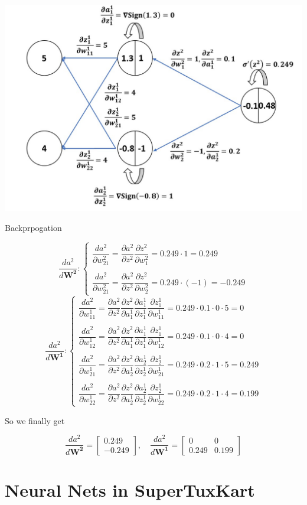 \documentclass{article}
\begin{document}
		$$$$
        \begin{minipage}[t]{\linewidth}
        		\captionsetup{type=figure}
               	\centering
               	\includegraphics[width=0.6\linewidth]
                				{images/Q2b.jpg}
                \caption{Backprpogation}      
        \end{minipage} 
        
		\newpage        
		\[
  			\dfrac{da^2}{d\boldsymbol{W^2}}:
  			\begin{cases}
               \dfrac{da^2}{\partial{w^2_{21}}}=\dfrac{\partial a^2}{\partial{z^2}}\dfrac{\partial z^2}{\partial{w^2_1}}=0.249\cdot1=0.249\\\\
               \dfrac{da^2}{\partial{w^2_{21}}}=\dfrac{\partial a^2}{\partial{z^2}}\dfrac{\partial z^2}{\partial{w^2_2}}=0.249\cdot(-1)=-0.249
            \end{cases}
		\]
		$$$$
		\[
  			\dfrac{da^2}{d\boldsymbol{W^1}}:
  			\begin{cases}
               \dfrac{da^2}{\partial{w^1_{11}}}=\dfrac{\partial a^2}{\partial{z^2}}\dfrac{\partial z^2}{\partial{a^1_1}}\dfrac{\partial a^1_1}{\partial{z^1_1}}\dfrac{\partial z^1_1}{\partial{w^1_{11}}}=0.249\cdot0.1\cdot0\cdot5=0\\\\
               \dfrac{da^2}{\partial{w^1_{12}}}=\dfrac{\partial a^2}{\partial{z^2}}\dfrac{\partial z^2}{\partial{a^1_1}}\dfrac{\partial a^1_1}{\partial{z^1_1}}\dfrac{\partial z^1_1}{\partial{w^1_{12}}}=0.249\cdot0.1\cdot0\cdot4=0\\\\
               \dfrac{da^2}{\partial{w^1_{21}}}=\dfrac{\partial a^2}{\partial{z^2}}\dfrac{\partial z^2}{\partial{a^1_2}}\dfrac{\partial a^1_2}{\partial{z^1_2}}\dfrac{\partial z^1_2}{\partial{w^1_{21}}}=0.249\cdot0.2\cdot1\cdot5=0.249\\\\
               \dfrac{da^2}{\partial{w^1_{22}}}=\dfrac{\partial a^2}{\partial{z^2}}\dfrac{\partial z^2}{\partial{a^1_2}}\dfrac{\partial a^1_2}{\partial{z^1_2}}\dfrac{\partial z^1_2}{\partial{w^1_{22}}}=0.249\cdot0.2\cdot1\cdot4=0.199
            \end{cases}
		\]
		
    	So we finally get
    	
    	$$\dfrac{da^2}{d\boldsymbol{W^2}}=\begin{bmatrix}0.249\\-0.249\end{bmatrix},\quad \dfrac{da^2}{d\boldsymbol{W^1}}=\begin{bmatrix}0 & 0\\0.249 & 0.199\end{bmatrix}$$
    	$$$$
			
        
    \section{Neural Nets in SuperTuxKart}
       
\end{document}
